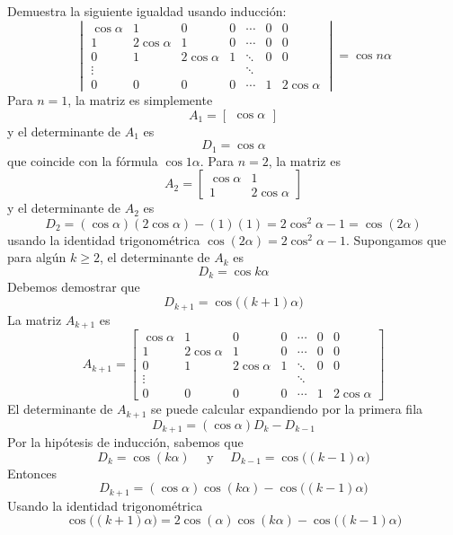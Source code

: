 \begin{example}
    Demuestra la siguiente igualdad usando inducción:
    $$\begin{vmatrix}
        \cos \alpha & 1 & 0 & 0 & \cdots & 0 & 0 \\
        1 & 2 \cos \alpha & 1 & 0 & \cdots & 0 & 0 \\
        0 & 1 & 2 \cos \alpha & 1 & \ddots & 0 & 0 \\
        \vdots & & & & \ddots & & \\
        0 & 0 & 0 & 0 & \cdots & 1 & 2 \cos \alpha
    \end{vmatrix} = \cos n \alpha$$\newpage
    \demostracion Para $n = 1$, la matriz es simplemente
    $$A_1 = \begin{bmatrix} \cos \alpha \end{bmatrix}$$
    y el determinante de $A_1$ es
    $$D_1 = \cos \alpha$$
    que coincide con la fórmula $\cos 1 \alpha $. Para $n = 2$, la matriz es
    $$A_2 = \begin{bmatrix}
        \cos \alpha & 1 \\
        1 & 2 \cos \alpha
    \end{bmatrix}$$
    y el determinante de $A_2$ es
    $$D_2 = (\cos \alpha)(2 \cos \alpha) - (1)(1) = 2 \cos^2 \alpha - 1 = \cos(2 \alpha)$$
    usando la identidad trigonométrica $\cos(2 \alpha) = 2 \cos^2 \alpha - 1$. Supongamos que para algún $k \geq 2$, el determinante de $A_k$ es
    $$D_k = \cos k \alpha$$
    Debemos demostrar que
    $$D_{k+1} = \cos \big((k+1) \alpha \big)$$
    La matriz $A_{k+1}$ es
    $$A_{k+1} = \begin{bmatrix}
        \cos \alpha & 1 & 0 & 0 & \cdots & 0 & 0 \\
        1 & 2 \cos \alpha & 1 & 0 & \cdots & 0 & 0 \\
        0 & 1 & 2 \cos \alpha & 1 & \ddots & 0 & 0 \\
        \vdots & & & & \ddots & & \\
        0 & 0 & 0 & 0 & \cdots & 1 & 2 \cos \alpha
    \end{bmatrix}$$
    El determinante de $A_{k+1}$ se puede calcular expandiendo por la primera fila
    $$D_{k+1} = (\cos \alpha) D_k - D_{k-1}$$
    Por la hipótesis de inducción, sabemos que
    $$D_k = \cos(k \alpha) \quad \text{ y } \quad D_{k-1} = \cos \big((k-1) \alpha \big)$$
    Entonces
    $$D_{k+1} = (\cos \alpha) \cos(k \alpha) - \cos \big((k-1) \alpha \big)$$
    Usando la identidad trigonométrica
    $$\cos \big((k+1) \alpha \big) = 2 \cos(\alpha) \cos(k \alpha) - \cos \big((k-1) \alpha \big)$$

\end{example}
